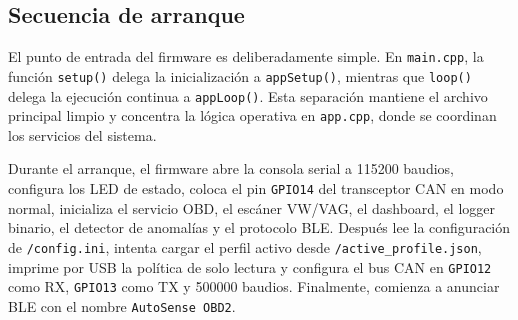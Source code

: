 \documentclass[12pt,letterpaper]{report}
\begin{document}
\subsection{Secuencia de arranque}

El punto de entrada del firmware es deliberadamente simple. En \texttt{main.cpp}, la función \texttt{setup()} delega la inicialización a \texttt{appSetup()}, mientras que \texttt{loop()} delega la ejecución continua a \texttt{appLoop()}. Esta separación mantiene el archivo principal limpio y concentra la lógica operativa en \texttt{app.cpp}, donde se coordinan los servicios del sistema.

Durante el arranque, el firmware abre la consola serial a 115200 baudios, configura los LED de estado, coloca el pin \texttt{GPIO14} del transceptor CAN en modo normal, inicializa el servicio OBD, el escáner VW/VAG, el dashboard, el logger binario, el detector de anomalías y el protocolo BLE. Después lee la configuración de \texttt{/config.ini}, intenta cargar el perfil activo desde \texttt{/active\_profile.json}, imprime por USB la política de solo lectura y configura el bus CAN en \texttt{GPIO12} como RX, \texttt{GPIO13} como TX y 500000 baudios. Finalmente, comienza a anunciar BLE con el nombre \texttt{AutoSense OBD2}.
\end{document}
